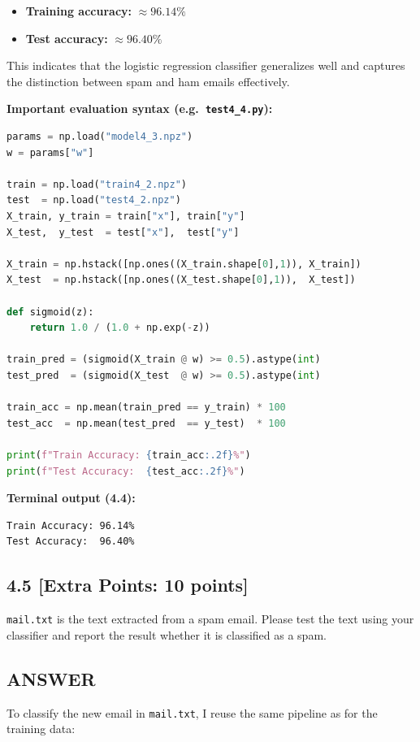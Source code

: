 \documentclass[12pt]{article}
\begin{document}
\begin{itemize}
  \item \textbf{Training accuracy:} $\approx 96.14\%$
  \item \textbf{Test accuracy:} $\approx 96.40\%$
\end{itemize}

This indicates that the logistic regression classifier generalizes well and
captures the distinction between spam and ham emails effectively.

\textbf{Important evaluation syntax (e.g.\ \texttt{test4\_4.py}):}
\begin{lstlisting}[language=Python]
params = np.load("model4_3.npz")
w = params["w"]

train = np.load("train4_2.npz")
test  = np.load("test4_2.npz")
X_train, y_train = train["x"], train["y"]
X_test,  y_test  = test["x"],  test["y"]

X_train = np.hstack([np.ones((X_train.shape[0],1)), X_train])
X_test  = np.hstack([np.ones((X_test.shape[0],1)),  X_test])

def sigmoid(z):
    return 1.0 / (1.0 + np.exp(-z))

train_pred = (sigmoid(X_train @ w) >= 0.5).astype(int)
test_pred  = (sigmoid(X_test  @ w) >= 0.5).astype(int)

train_acc = np.mean(train_pred == y_train) * 100
test_acc  = np.mean(test_pred  == y_test)  * 100

print(f"Train Accuracy: {train_acc:.2f}%")
print(f"Test Accuracy:  {test_acc:.2f}%")
\end{lstlisting}

\textbf{Terminal output (4.4):}
\begin{lstlisting}
Train Accuracy: 96.14%
Test Accuracy:  96.40%
\end{lstlisting}

\subsection*{4.5 [Extra Points: 10 points]}
\texttt{mail.txt} is the text extracted from a spam email. Please test the text using your classifier and report the result whether it is classified as a spam.
\subsection*{ANSWER}
To classify the new email in \texttt{mail.txt}, I reuse the same pipeline as
for the training data:
\end{document}
